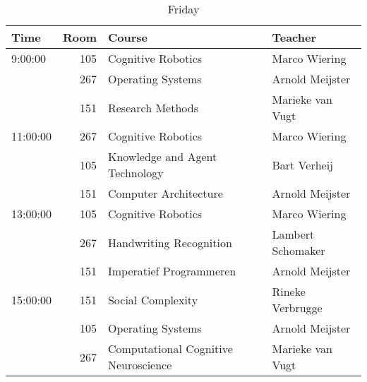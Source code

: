 \begin{table}
    \centering
    \caption{Friday}
    \begin{tabular}{l|r|l|l}
        Time & Room & Course & Teacher \\
        \hline
        \hline
        9:00:00 & 105 & Cognitive Robotics & Marco Wiering\\
        & 267 & Operating Systems & Arnold Meijster\\
        & 151 & Research Methods & Marieke van Vugt\\\hline
        11:00:00 & 267 & Cognitive Robotics & Marco Wiering\\
        & 105 & Knowledge and Agent Technology & Bart Verheij\\
        & 151 & Computer Architecture & Arnold Meijster\\\hline
        13:00:00 & 105 & Cognitive Robotics & Marco Wiering\\
        & 267 & Handwriting Recognition & Lambert Schomaker\\
        & 151 & Imperatief Programmeren & Arnold Meijster\\\hline
        15:00:00 & 151 & Social Complexity & Rineke Verbrugge\\
        & 105 & Operating Systems & Arnold Meijster\\
        & 267 & Computational Cognitive Neuroscience & Marieke van Vugt\\
    \end{tabular}
\end{table}


